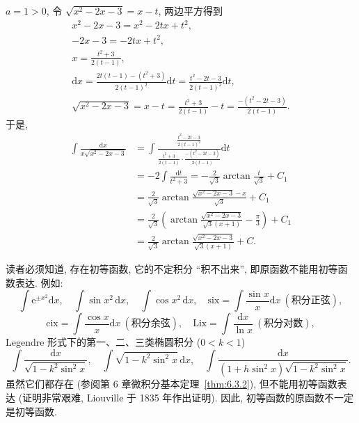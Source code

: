 \begin{solution}[解法 2]
$a=1>0$, 令 $\sqrt{x^{2}-2x-3}=x-t$, 两边平方得到
\begin{gather*}
x^{2}-2x-3=x^{2}-2tx+t^{2},\\
-2x-3=-2tx+t^{2},\\
x=\frac{t^{2}+3}{2(t-1)},\\
\mathrm{d}x=\frac{2t(t-1)-(t^{2}+3)}{2(t-1)^{2}}\mathrm{d}t=\frac{t^{2}-2t-3}{2(t-1)^{2}}\mathrm{d}t,\\
\sqrt{x^{2}-2x-3}=x-t=\frac{t^{2}+3}{2(t-1)}-t=\frac{-(t^{2}-2t-3)}{2(t-1)}.
\end{gather*}
于是,
\begin{align*}
\int\frac{\mathrm{d}x}{x\sqrt{x^{2}-2x-3}}
&=\int\frac{\frac{t^{2}-2t-3}{2(t-1)^{2}}}{\frac{t^{2}+3}{2(t-1)}\cdot\frac{-(t^{2}-2t-3)}{2(t-1)}}\mathrm{d}t\\
&=-2\int\frac{\mathrm{d}t}{t^{2}+3}=-\frac{2}{\sqrt{3}}\arctan\frac{t}{\sqrt{3}}+C_{1}\\
&=\frac{2}{\sqrt{3}}\arctan\frac{\sqrt{x^{2}-2x-3}-x}{\sqrt{3}}+C_{1}\\
&=\frac{2}{\sqrt{3}}\left(\arctan\frac{\sqrt{x^{2}-2x-3}}{\sqrt{3}(x+1)}-\frac{\pi}{3}\right)+C_{1}\\
&=\frac{2}{\sqrt{3}}\arctan\frac{\sqrt{x^{2}-2x-3}}{\sqrt{3}(x+1)}+C.
\end{align*}
\end{solution}

读者必须知道, 存在初等函数, 它的不定积分 ``积不出来'', 即原函数不能用初等函数表达. 例如:
\[
\int\mathrm{e}^{\pm x^{2}}\mathrm{d}x,\quad \int\sin x^{2}\,\mathrm{d}x,\quad \int\cos x^{2}\,\mathrm{d}x,\quad
\mathrm{six}=\int\frac{\sin x}{x}\mathrm{d}x\ (\text{积分正弦}),
\]
\[
\mathrm{cix}=\int\frac{\cos x}{x}\mathrm{d}x\ (\text{积分余弦}),\quad
\mathrm{Lix}=\int\frac{\mathrm{d}x}{\ln x}\ (\text{积分对数}),
\]
Legendre 形式下的第一、二、三类椭圆积分 ($0<k<1$)
\[
\int\frac{\mathrm{d}x}{\sqrt{1-k^{2}\sin^{2}x}},\quad \int\sqrt{1-k^{2}\sin^{2}x}\,\mathrm{d}x,\quad
\int\frac{\mathrm{d}x}{(1+h\sin^{2}x)\sqrt{1-k^{2}\sin^{2}x}}.
\]
虽然它们都存在 (参阅第 6 章微积分基本定理~\ref{thm:6.3.2}), 但不能用初等函数表达 (证明非常艰难, Liouville 于 1835 年作出证明). 因此, 初等函数的原函数不一定是初等函数.

